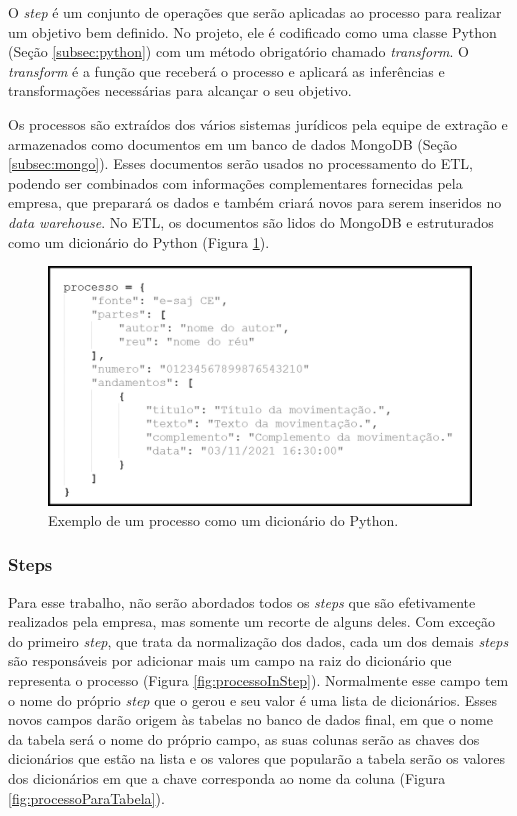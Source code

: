 O \textit{step} é um conjunto de operações que serão aplicadas ao processo para realizar um objetivo bem definido. No projeto, ele é codificado como uma classe Python (Seção \ref{subsec:python}) com um método obrigatório chamado \textit{transform}. O \textit{transform} é a função que receberá o processo e aplicará as inferências e transformações necessárias para alcançar o seu objetivo.

Os processos são extraídos dos vários sistemas jurídicos pela equipe de extração e armazenados como documentos em um banco de dados MongoDB (Seção \ref{subsec:mongo}). Esses documentos serão usados no processamento do ETL, podendo ser combinados com informações complementares fornecidas pela empresa, que preparará os dados e também criará novos para serem inseridos no \textit{data warehouse}. No ETL, os documentos são lidos do MongoDB e estruturados como um dicionário do Python (Figura \ref{fig:processoPython}).

\begin{figure}[ht]
\centering
\includegraphics[width=1\textwidth]{imagens/processo-python.png}
\caption{Exemplo de um processo como um dicionário do Python.}
\label{fig:processoPython}
\end{figure}


\subsubsection{Steps}
\label{subsec:steps}

Para esse trabalho, não serão abordados todos os \textit{steps} que são efetivamente realizados pela empresa, mas somente um recorte de alguns deles. Com exceção do primeiro \textit{step}, que trata da normalização dos dados, cada um dos demais \textit{steps} são responsáveis por adicionar mais um campo na raiz do dicionário que representa o processo (Figura \ref{fig:processoInStep}). Normalmente esse campo tem o nome do próprio \textit{step} que o gerou e seu valor é uma lista de dicionários. Esses novos campos darão origem às tabelas no banco de dados final, em que o nome da tabela será o nome do próprio campo, as suas colunas serão as chaves dos dicionários que estão na lista e os valores que popularão a tabela serão os valores dos dicionários em que a chave corresponda ao nome da coluna (Figura \ref{fig:processoParaTabela}).

